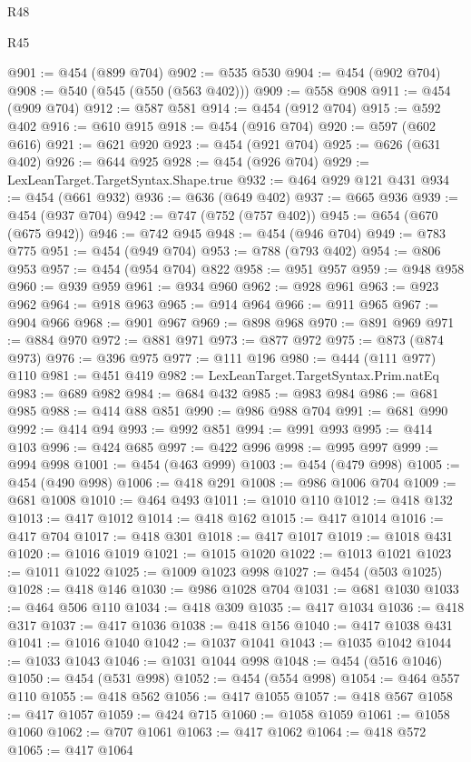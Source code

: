 \begin{lexlean}{R48}
\begin{lexlean}{R45}
\begin{coremodule}
{{{{{{{{{{{{{{{{{{{{{{{{{{{{{{{{{{{{{{{{{{{{{{{{{{{{{{{{{{{{{{{{{{{{{{{{{{{{{{{{{{{{{{{{{{{@901 := @454 (@899 @704)
@902 := @535 @530
@904 := @454 (@902 @704)
@908 := @540 (@545 (@550 (@563 @402)))
@909 := @558 @908
@911 := @454 (@909 @704)
@912 := @587 @581
@914 := @454 (@912 @704)
@915 := @592 @402
@916 := @610 @915
@918 := @454 (@916 @704)
@920 := @597 (@602 @616)
@921 := @621 @920
@923 := @454 (@921 @704)
@925 := @626 (@631 @402)
@926 := @644 @925
@928 := @454 (@926 @704)
@929 := LexLeanTarget.TargetSyntax.Shape.true
@932 := @464 @929 @121 @431
@934 := @454 (@661 @932)
@936 := @636 (@649 @402)
@937 := @665 @936
@939 := @454 (@937 @704)
@942 := @747 (@752 (@757 @402))
@945 := @654 (@670 (@675 @942))
@946 := @742 @945
@948 := @454 (@946 @704)
@949 := @783 @775
@951 := @454 (@949 @704)
@953 := @788 (@793 @402)
@954 := @806 @953
@957 := @454 (@954 @704) @822
@958 := @951 @957
@959 := @948 @958
@960 := @939 @959
@961 := @934 @960
@962 := @928 @961
@963 := @923 @962
@964 := @918 @963
@965 := @914 @964
@966 := @911 @965
@967 := @904 @966
@968 := @901 @967
@969 := @898 @968
@970 := @891 @969
@971 := @884 @970
@972 := @881 @971
@973 := @877 @972
@975 := @873 (@874 @973)
@976 := @396 @975
@977 := @111 @196
@980 := @444 (@111 @977) @110
@981 := @451 @419
@982 := LexLeanTarget.TargetSyntax.Prim.natEq
@983 := @689 @982
@984 := @684 @432
@985 := @983 @984
@986 := @681 @985
@988 := @414 @88 @851
@990 := @986 @988 @704
@991 := @681 @990
@992 := @414 @94
@993 := @992 @851
@994 := @991 @993
@995 := @414 @103
@996 := @424 @685
@997 := @422 @996
@998 := @995 @997
@999 := @994 @998
@1001 := @454 (@463 @999)
@1003 := @454 (@479 @998)
@1005 := @454 (@490 @998)
@1006 := @418 @291
@1008 := @986 @1006 @704
@1009 := @681 @1008
@1010 := @464 @493
@1011 := @1010 @110
@1012 := @418 @132
@1013 := @417 @1012
@1014 := @418 @162
@1015 := @417 @1014
@1016 := @417 @704
@1017 := @418 @301
@1018 := @417 @1017
@1019 := @1018 @431
@1020 := @1016 @1019
@1021 := @1015 @1020
@1022 := @1013 @1021
@1023 := @1011 @1022
@1025 := @1009 @1023 @998
@1027 := @454 (@503 @1025)
@1028 := @418 @146
@1030 := @986 @1028 @704
@1031 := @681 @1030
@1033 := @464 @506 @110
@1034 := @418 @309
@1035 := @417 @1034
@1036 := @418 @317
@1037 := @417 @1036
@1038 := @418 @156
@1040 := @417 @1038 @431
@1041 := @1016 @1040
@1042 := @1037 @1041
@1043 := @1035 @1042
@1044 := @1033 @1043
@1046 := @1031 @1044 @998
@1048 := @454 (@516 @1046)
@1050 := @454 (@531 @998)
@1052 := @454 (@554 @998)
@1054 := @464 @557 @110
@1055 := @418 @562
@1056 := @417 @1055
@1057 := @418 @567
@1058 := @417 @1057
@1059 := @424 @715
@1060 := @1058 @1059
@1061 := @1058 @1060
@1062 := @707 @1061
@1063 := @417 @1062
@1064 := @418 @572
@1065 := @417 @1064
}}}}}}}}}}}}}}}}}}}}}}}}}}}}}}}}}}}}}}}}}}}}}}}}}}}}}}}}}}}}}}}}}}}}}}}}}}}}}}}}}}}}}}}}}}}
\end{coremodule}
\end{lexlean}
\end{lexlean}
